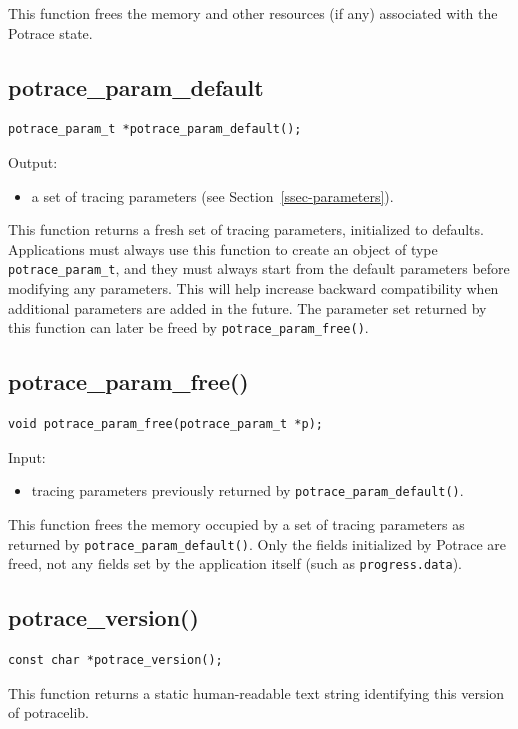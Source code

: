 \documentclass{article}
\begin{document}
This function frees the memory and other resources (if any) associated
with the Potrace state.

\subsection{potrace\_param\_default}\label{5c}

\begin{verbatim}
potrace_param_t *potrace_param_default();
\end{verbatim}

\noindent Output:
\begin{itemize}
\item a set of tracing parameters (see Section~\ref{ssec-parameters}). 
\end{itemize}

This function returns a fresh set of tracing parameters, initialized
to defaults.  Applications must always use this function to create an
object of type \verb!potrace_param_t!, and they must always start from
the default parameters before modifying any parameters.  This will
help increase backward compatibility when additional parameters are
added in the future. The parameter set returned by this function can
later be freed by \verb!potrace_param_free()!.

\subsection{potrace\_param\_free()}\label{5d}

\begin{verbatim}
void potrace_param_free(potrace_param_t *p);
\end{verbatim}

\noindent Input:
\begin{itemize}
\item tracing parameters previously returned by
  \verb!potrace_param_default()!.
\end{itemize}

This function frees the memory occupied by a set of tracing parameters
as returned by \verb!potrace_param_default()!. Only the fields
initialized by Potrace are freed, not any fields set by the
application itself (such as \verb!progress.data!).

\subsection{potrace\_version()}\label{5e}

\begin{verbatim}
const char *potrace_version();
\end{verbatim}

This function returns a static human-readable text string identifying
this version of potracelib.
\end{document}
